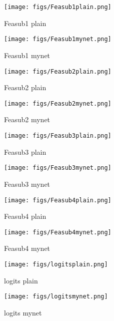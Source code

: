 \documentclass[]{article}
\begin{document}
\begin{figure}
\begin{minipage}[t]{0.5\linewidth}
\centering
\texttt{[image: figs/Feasub1plain.png]}
\caption{Feasub1 plain}
\label{fig:Feasub1 plain}
\end{minipage}%
\begin{minipage}[t]{0.5\linewidth}
\centering
\texttt{[image: figs/Feasub1mynet.png]}
\caption{Feasub1 mynet}
\label{fig:Feasub1 mynet}
\end{minipage}
\end{figure}
\begin{figure}
\begin{minipage}[t]{0.5\linewidth}
\centering
\texttt{[image: figs/Feasub2plain.png]}
\caption{Feasub2 plain}
\label{fig:Feasub2 plain}
\end{minipage}%
\begin{minipage}[t]{0.5\linewidth}
\centering
\texttt{[image: figs/Feasub2mynet.png]}
\caption{Feasub2 mynet}
\label{fig:Feasub2 mynet}
\end{minipage}
\end{figure}
\begin{figure}
\begin{minipage}[t]{0.5\linewidth}
\centering
\texttt{[image: figs/Feasub3plain.png]}
\caption{Feasub3 plain}
\label{fig:Feasub3 plain}
\end{minipage}%
\begin{minipage}[t]{0.5\linewidth}
\centering
\texttt{[image: figs/Feasub3mynet.png]}
\caption{Feasub3 mynet}
\label{fig:Feasub3 mynet}
\end{minipage}
\end{figure}
\begin{figure}
\begin{minipage}[t]{0.5\linewidth}
\centering
\texttt{[image: figs/Feasub4plain.png]}
\caption{Feasub4 plain}
\label{fig:Feasub4 plain}
\end{minipage}%
\begin{minipage}[t]{0.5\linewidth}
\centering
\texttt{[image: figs/Feasub4mynet.png]}
\caption{Feasub4 mynet}
\label{fig:Feasub4mynet}
\end{minipage}
\end{figure}
\begin{figure}
\begin{minipage}[t]{0.5\linewidth}
\centering
\texttt{[image: figs/logitsplain.png]}
\caption{logits plain}
\label{fig:logits plain}
\end{minipage}%
\begin{minipage}[t]{0.5\linewidth}
\centering
\texttt{[image: figs/logitsmynet.png]}
\caption{logits mynet}
\label{fig:logits mynet}
\end{minipage}
\end{figure}
\end{document}
